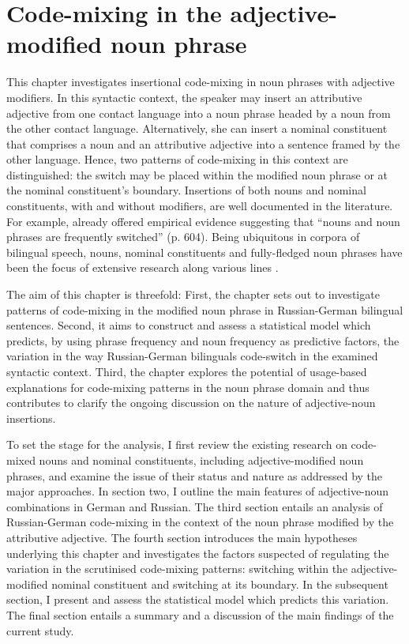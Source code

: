 \chapter{Code-mixing in the adjective-modified noun phrase}\label{NP}

This chapter investigates insertional code-mixing in noun phrases with adjective modifiers. In this syntactic context, the speaker may insert an attributive adjective from one contact language into a noun phrase headed by a noun from the other contact language. Alternatively, she can insert a nominal constituent that comprises a noun and an attributive adjective into a sentence framed by the other language. Hence, two patterns of code-mixing in this context are distinguished: the switch may be placed within the modified noun phrase or at the nominal constituent's boundary. Insertions of both nouns and nominal constituents, with and without modifiers, are well documented in the literature. For example, already \citet{poplack-sometimes-1980} offered empirical evidence suggesting that ``nouns and noun phrases are frequently switched'' (p. 604). Being ubiquitous in corpora of bilingual speech, nouns, nominal constituents and fully-fledged noun phrases have been the focus of extensive research along various lines \citep[e.g.,][]{sankoff-et-al-1990,poplack-meechan-1995, cantone-macswan,parafita-couto-et-al}.

The aim of this chapter is threefold: First, the chapter sets out to investigate patterns of code-mixing in the modified noun phrase in Russian-German bilingual sentences. Second, it aims to construct and assess a statistical model which predicts, by using phrase frequency and noun frequency as predictive factors, the variation in the way Russian-German bilinguals code-switch in the examined syntactic context. Third, the chapter explores the potential of usage-based explanations for code-mixing patterns in the noun phrase domain and thus contributes to clarify the ongoing discussion on the nature of adjective-noun insertions.

To set the stage for the analysis, I first review the existing research on code-mixed nouns and nominal constituents, including adjective-modified noun phrases, and examine the issue of their status and nature as addressed by the major approaches. In section two, I outline the main features of adjective-noun combinations in German and Russian. The third section entails an analysis of Russian-German code-mixing in the context of the noun phrase modified by the attributive adjective. The fourth section introduces the main hypotheses underlying this chapter and investigates the factors suspected of regulating the variation in the scrutinised code-mixing patterns: switching within the adjective-modified nominal constituent and switching at its boundary. In the subsequent section, I present and assess the statistical model which predicts this variation. The final section entails a summary and a discussion of the main findings of the current study.

